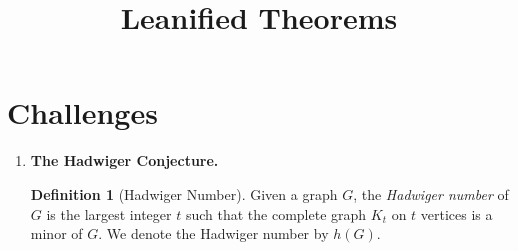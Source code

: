 \documentclass[12pt]{article}
\numberwithin{equation}{section}
\theoremstyle{definition}
\newtheorem{definition}{Definition}
\newcommand{\ev}[1]{( #1 )}
\begin{document}
\title{Leanified Theorems}


\section*{Challenges}

\begin{enumerate}
\item \textbf{The Hadwiger Conjecture. }  

\begin{definition}[Hadwiger Number]
Given a graph $G$, the \textit{Hadwiger number} of $G$ is the largest integer $t$ such that the complete graph $K_t$ on $t$ vertices is a minor of $G$.
We denote the Hadwiger number by $h\ev{G}$.
\end{definition}

\end{enumerate}
\end{document}
